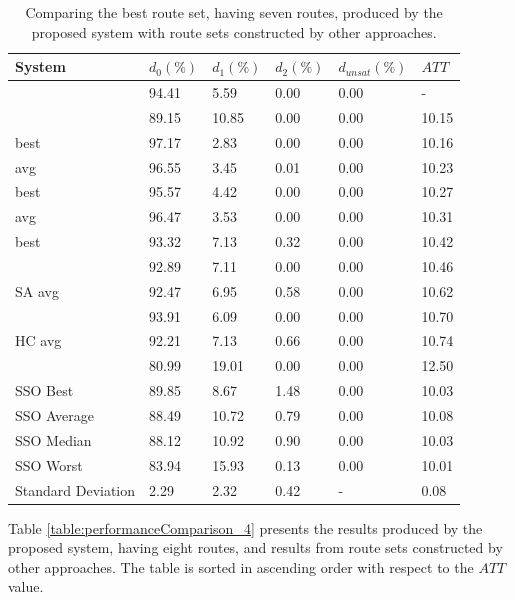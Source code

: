 \begin{table}[H]
    \centering
    \hspace*{-1.0cm}
    \begin{tabular}{|l||l|l|l|l|l|}
    \hline
    \textbf{System} & $d_0(\%)$ & $d_1(\%)$ & $d_2(\%)$ & $d_{unsat}(\%)$ & $ATT$ \\
    \hline
    \citet{nikolic14} & 94.41 & 5.59 & 0.00 & 0.00 & - \\
    \citet{chakroborty02} & 89.15 & 10.85 & 0.00 & 0.00 & 10.15 \\
    \citet{kechagiopoulos14} best & 97.17 & 2.83 & 0.00 & 0.00 & 10.16 \\
    \citet{kechagiopoulos14} avg & 96.55 & 3.45 & 0.01 & 0.00 & 10.23 \\
    \citet{chew12} best & 95.57 & 4.42 & 0.00 & 0.00 & 10.27 \\
    \citet{chew12} avg & 96.47 & 3.53 & 0.00 & 0.00 & 10.31 \\
    \citet{fan10} best & 93.32 & 7.13 & 0.32 & 0.00 & 10.42  \\
    \citet{zhang10} & 92.89 & 7.11 & 0.00 & 0.00 & 10.46 \\
    \citet{fan10} SA avg & 92.47 & 6.95 & 0.58 & 0.00 & 10.62 \\
    \citet{kidwai98} & 93.91 & 6.09 & 0.00 & 0.00 & 10.70 \\
    \citet{fan10} HC avg & 92.21 & 7.13 & 0.66 & 0.00 & 10.74 \\
    \citet{baaj91} & 80.99 & 19.01 & 0.00 & 0.00 & 12.50 \\
    \hline
    SSO Best & 89.85 & 8.67 & 1.48 & 0.00 & 10.03\\
    SSO Average & 88.49 & 10.72 & 0.79 & 0.00 & 10.08\\
    SSO Median & 88.12 & 10.92 & 0.90 & 0.00 & 10.03\\
    SSO Worst & 83.94 & 15.93 & 0.13 & 0.00 & 10.01\\
    Standard Deviation & 2.29 & 2.32 & 0.42 & - & 0.08\\
    \hline
    \end{tabular}
    \caption {Comparing the best route set, having seven routes, produced by the proposed system with route sets constructed by other approaches.}
    \label{table:performanceComparison_7}
\end{table}
Table \vref{table:performanceComparison_4} presents the results produced by the proposed system, having eight routes, and results from route sets constructed by other approaches. The table is sorted in ascending order with respect to the $ATT$ value.

